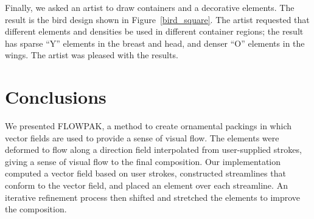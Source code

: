 Finally, we asked an artist to draw containers and a decorative elements.
The result is the bird design shown in Figure~\ref{bird_square}.
The artist requested that different elements and densities be used in 
different container regions; the result has sparse ``Y'' elements in 
the breast and head, and denser ``O'' elements in the wings. The artist was pleased with the results.





\section{Conclusions}
\label{flowpak_conclusions}

We presented FLOWPAK, a method to create ornamental packings
in which vector fields are used to provide a sense of visual flow. 
The elements were deformed to flow along a direction field interpolated
from user-supplied strokes, giving a sense of visual flow to the final composition.
Our implementation computed a vector field based on user strokes,
constructed streamlines that conform to the vector field, and placed an
element over each streamline. An iterative refinement process then
shifted and stretched the elements to improve the composition.




